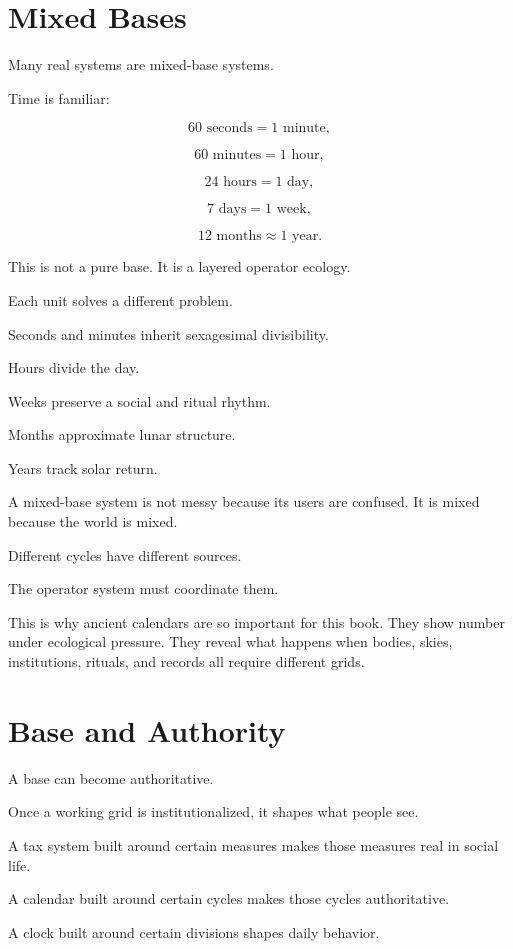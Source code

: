 \documentclass[11pt]{book}
\begin{document}
\section{Mixed Bases}

Many real systems are mixed-base systems.

Time is familiar:

\[
60 \text{ seconds} = 1 \text{ minute},
\]

\[
60 \text{ minutes} = 1 \text{ hour},
\]

\[
24 \text{ hours} = 1 \text{ day},
\]

\[
7 \text{ days} = 1 \text{ week},
\]

\[
12 \text{ months} \approx 1 \text{ year}.
\]

This is not a pure base. It is a layered operator ecology.

Each unit solves a different problem.

Seconds and minutes inherit sexagesimal divisibility.

Hours divide the day.

Weeks preserve a social and ritual rhythm.

Months approximate lunar structure.

Years track solar return.

A mixed-base system is not messy because its users are confused. It is mixed because the world is mixed.

Different cycles have different sources.

The operator system must coordinate them.

This is why ancient calendars are so important for this book. They show number under ecological pressure. They reveal what happens when bodies, skies, institutions, rituals, and records all require different grids.

\section{Base and Authority}

A base can become authoritative.

Once a working grid is institutionalized, it shapes what people see.

A tax system built around certain measures makes those measures real in social life.

A calendar built around certain cycles makes those cycles authoritative.

A clock built around certain divisions shapes daily behavior.
\end{document}
